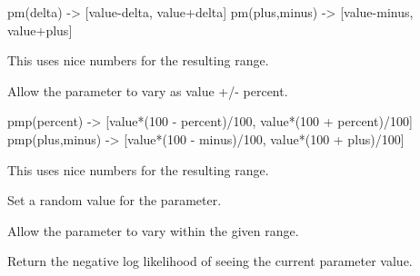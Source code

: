\documentclass[letterpaper,10pt,english]{sphinxmanual}
\begin{document}
\begin{fulllineitems}
\begin{fulllineitems}
pm(delta) -\textgreater{} {[}value-delta, value+delta{]}
pm(plus,minus) -\textgreater{} {[}value-minus, value+plus{]}

This uses nice numbers for the resulting range.

\end{fulllineitems}


\begin{fulllineitems}
\label{api/mystic.parameter:refl1d.mystic.parameter.Parameter.pmp}
Allow the parameter to vary as value +/- percent.

pmp(percent) -\textgreater{} {[}value*(100 - percent)/100, value*(100 + percent)/100{]}
pmp(plus,minus) -\textgreater{} {[}value*(100 - minus)/100, value*(100 + plus)/100{]}

This uses nice numbers for the resulting range.

\end{fulllineitems}


\begin{fulllineitems}
\label{api/mystic.parameter:refl1d.mystic.parameter.Parameter.rand}
Set a random value for the parameter.

\end{fulllineitems}


\begin{fulllineitems}
\label{api/mystic.parameter:refl1d.mystic.parameter.Parameter.range}
Allow the parameter to vary within the given range.

\end{fulllineitems}


\begin{fulllineitems}
\label{api/mystic.parameter:refl1d.mystic.parameter.Parameter.residual}
Return the negative log likelihood of seeing the current parameter value.


\end{fulllineitems}
\end{fulllineitems}
\end{document}
